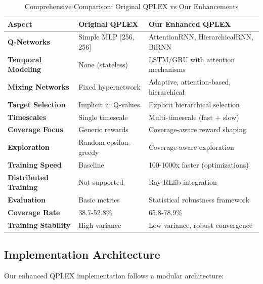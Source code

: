 \documentclass[12pt,a4paper]{report}
\begin{document}
\begin{table}[H]
\centering
\caption{Comprehensive Comparison: Original QPLEX vs Our Enhancements}
\begin{tabular}{lp{5cm}p{5cm}}
\toprule
\textbf{Aspect} & \textbf{Original QPLEX} & \textbf{Our Enhanced QPLEX} \\
\midrule
\textbf{Q-Networks} & Simple MLP [256, 256] & AttentionRNN, HierarchicalRNN, BiRNN \\
\textbf{Temporal Modeling} & None (stateless) & LSTM/GRU with attention mechanisms \\
\textbf{Mixing Networks} & Fixed hypernetwork & Adaptive, attention-based, hierarchical \\
\textbf{Target Selection} & Implicit in Q-values & Explicit hierarchical selection \\
\textbf{Timescales} & Single timescale & Multi-timescale (fast + slow) \\
\textbf{Coverage Focus} & Generic rewards & Coverage-aware reward shaping \\
\textbf{Exploration} & Random epsilon-greedy & Coverage-aware exploration \\
\textbf{Training Speed} & Baseline & 100-1000x faster (optimizations) \\
\textbf{Distributed Training} & Not supported & Ray RLlib integration \\
\textbf{Evaluation} & Basic metrics & Statistical robustness framework \\
\textbf{Coverage Rate} & 38.7-52.8\% & 65.8-78.9\% \\
\textbf{Training Stability} & High variance & Low variance, robust convergence \\
\bottomrule
\end{tabular}
\end{table}

\subsection{Implementation Architecture}

Our enhanced QPLEX implementation follows a modular architecture:
\end{document}
